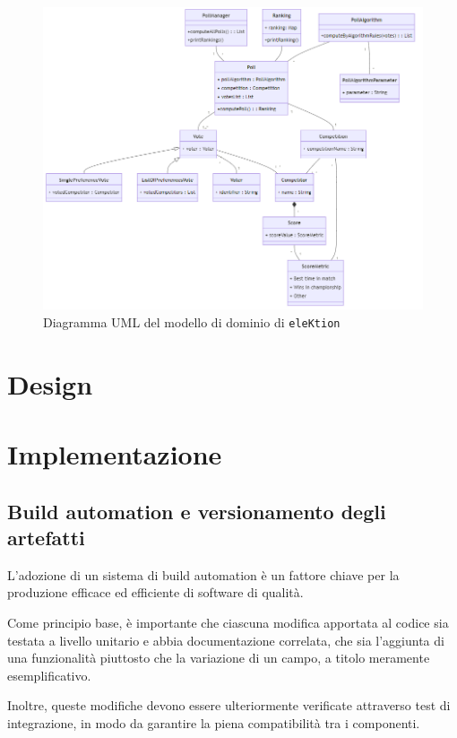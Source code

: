 \documentclass[12pt,a4paper,openright,twoside]{book}
\begin{document}
\begin{figure}
   \centering
    \includegraphics[width=1.1\linewidth]{figures/modellodominio.png}
    \caption{Diagramma UML del modello di dominio di \texttt{eleKtion}}
   \label{fig:modellodominio}
\end{figure}

\chapter{Design}
\chapter{Implementazione}

\section{Build automation e versionamento degli artefatti}
L'adozione di un sistema di build automation è un fattore chiave per la produzione
efficace ed efficiente di software di qualità.

Come principio base, è importante che ciascuna modifica apportata al codice
sia testata a livello unitario e abbia documentazione correlata, che sia l'aggiunta 
di una funzionalità piuttosto che la variazione di un campo, a titolo meramente
esemplificativo. 

Inoltre, queste modifiche devono essere ulteriormente 
verificate attraverso test di integrazione, in modo da garantire la piena
compatibilità tra i componenti. 
\end{document}
